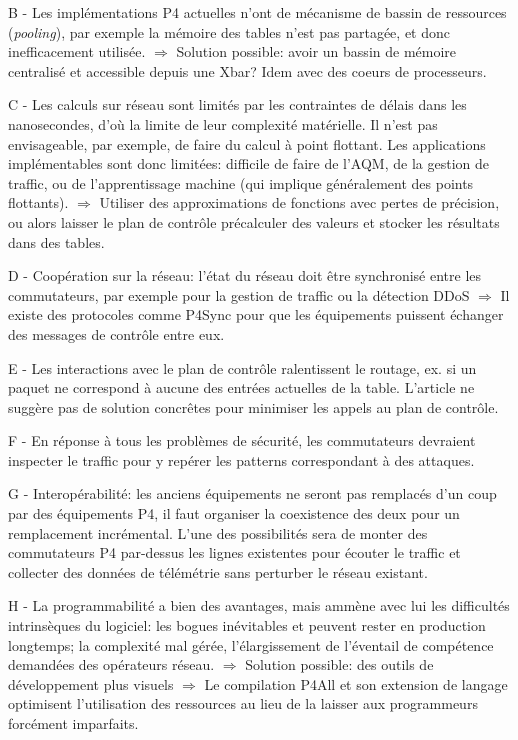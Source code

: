 B - Les implémentations P4 actuelles n'ont de mécanisme de bassin de ressources (\emph{pooling}), par exemple la mémoire des tables n'est pas partagée, et donc inefficacement utilisée.
$\Rightarrow$ Solution possible: avoir un bassin de mémoire centralisé et accessible depuis une Xbar? Idem avec des coeurs de processeurs.

C - Les calculs sur réseau sont limités par les contraintes de délais dans les nanosecondes, d'où la limite de leur complexité matérielle. Il n'est pas envisageable, par exemple, de faire du calcul à point flottant. Les applications implémentables sont donc limitées: difficile de faire de l'AQM, de la gestion de traffic, ou de l'apprentissage machine (qui implique généralement des points flottants).
$\Rightarrow$ Utiliser des approximations de fonctions avec pertes de précision, ou alors laisser le plan de contrôle précalculer des valeurs et stocker les résultats dans des tables.

D - Coopération sur la réseau: l'état du réseau doit être synchronisé entre les commutateurs, par exemple pour la gestion de traffic ou la détection DDoS
$\Rightarrow$ Il existe des protocoles comme P4Sync pour que les équipements puissent échanger des messages de contrôle entre eux.

E - Les interactions avec le plan de contrôle ralentissent le routage, ex. si un paquet ne correspond à aucune des entrées actuelles de la table. L'article ne suggère pas de solution concrêtes pour minimiser les appels au plan de contrôle.

F - En réponse à tous les problèmes de sécurité, les commutateurs devraient inspecter le traffic pour y repérer les patterns correspondant à des attaques.

G - Interopérabilité: les anciens équipements ne seront pas remplacés d'un coup par des équipements P4, il faut organiser la coexistence des deux pour un remplacement incrémental. L'une des possibilités sera de monter des commutateurs P4 par-dessus les lignes existentes pour écouter le traffic et collecter des données de télémétrie sans perturber le réseau existant.

H - La programmabilité a bien des avantages, mais ammène avec lui les difficultés intrinsèques du logiciel: les bogues inévitables et peuvent rester en production longtemps; la complexité mal gérée, l'élargissement de l'éventail de compétence demandées des opérateurs réseau.
$\Rightarrow$ Solution possible: des outils de développement plus visuels
$\Rightarrow$ Le compilation P4All et son extension de langage optimisent l'utilisation des ressources au lieu de la laisser aux programmeurs forcément imparfaits.

